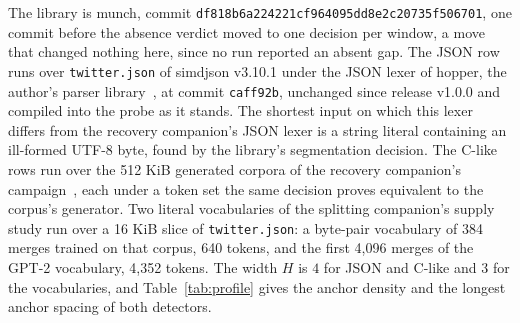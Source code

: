 \documentclass[11pt,a4paper]{article}
\theoremstyle{definition}
\theoremstyle{plain}
\newcommand{\code}[1]{\texttt{#1}}
\begin{document}
The library is munch, commit \code{df818b6a224221cf964095dd8e2c20735f506701}, one commit before the absence verdict
moved to one decision per window, a move that changed nothing here, since no run reported an absent gap. The JSON row
runs over \code{twitter.json} of simdjson v3.10.1 under the JSON lexer of hopper, the author's parser
library~\cite{hopper},  at commit \code{caff92b}, unchanged since release v1.0.0 and
compiled into the probe as it stands. The shortest input on which this lexer differs from the recovery companion's JSON
lexer is a string literal containing an ill-formed UTF-8 byte, found by the library's segmentation decision. The C-like
rows run over the 512 KiB generated corpora of the recovery companion's campaign~\cite{nidhogg2026panicmode}, each under
a token set the same decision proves equivalent to the corpus's generator. Two literal vocabularies of the splitting
companion's supply study run over a 16 KiB slice of \code{twitter.json}: a byte-pair vocabulary of 384 merges trained on
that corpus, 640 tokens, and the first 4{,}096 merges of the GPT-2 vocabulary, 4{,}352 tokens. The width $H$ is $4$ for
JSON and C-like and $3$ for the vocabularies, and Table~\ref{tab:profile} gives the anchor density and the longest
anchor spacing of both detectors.
\end{document}
